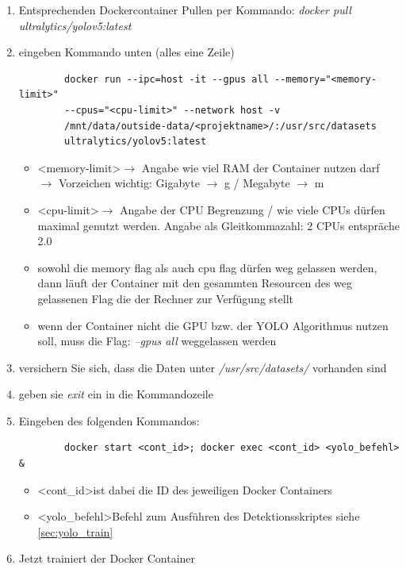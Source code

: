 \begin{enumerate}
    \item Entsprechenden Dockercontainer Pullen per Kommando: \textit{docker pull ultralytics/yolov5:latest} 
    \item eingeben Kommando unten (alles eine Zeile)
    \begin{verbatim}
        docker run --ipc=host -it --gpus all --memory="<memory-limit>"
        --cpus="<cpu-limit>" --network host -v 
        /mnt/data/outside-data/<projektname>/:/usr/src/datasets
        ultralytics/yolov5:latest
    \end{verbatim}
    \begin{itemize}
        \item \textless memory-limit\textgreater $\rightarrow$ Angabe wie viel RAM der Container nutzen darf $\rightarrow$ Vorzeichen wichtig: Gigabyte  $\rightarrow$ g / Megabyte $\rightarrow$ m
        \item \textless cpu-limit\textgreater $\rightarrow$ Angabe der CPU Begrenzung / wie viele CPUs dürfen maximal genutzt werden. Angabe als Gleitkommazahl: 2 CPUs entspräche 2.0
        \item sowohl die memory flag als auch cpu flag dürfen weg gelassen werden, dann läuft der Container mit den gesammten Resourcen des weg gelassenen Flag die der Rechner zur Verfügung stellt
        \item wenn der Container nicht die GPU bzw. der YOLO Algorithmus nutzen soll, muss die Flag: \textit{--gpus all} weggelassen werden
    \end{itemize}
    \item versichern Sie sich, dass die Daten unter \textit{/usr/src/datasets/} vorhanden sind
    \item geben sie \textit{exit} ein in die Kommandozeile 
    \item Eingeben des folgenden Kommandos:
    \begin{verbatim}
        docker start <cont_id>; docker exec <cont_id> <yolo_befehl> &
    \end{verbatim}
    \begin{itemize}
        \item  \textless cont\_id\textgreater  ist dabei die ID des jeweiligen Docker Containers
        \item \textless yolo\_befehl\textgreater  Befehl zum Ausführen des Detektionsskriptes siehe \autoref{sec:yolo_train}
    \end{itemize}
    \item Jetzt trainiert der Docker Container
\end{enumerate}

